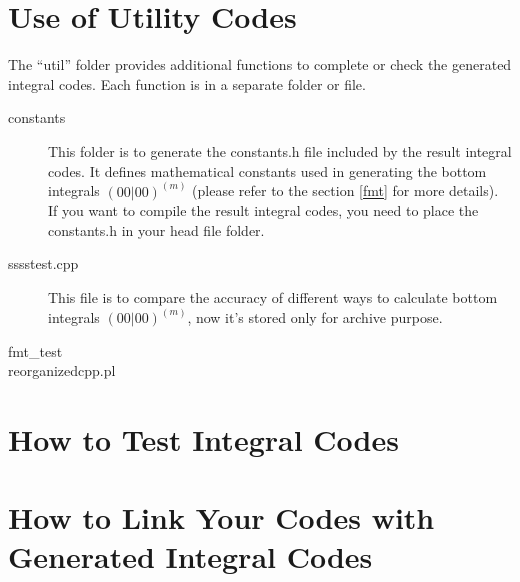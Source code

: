 \section{Use of Utility Codes}
%
%
%
The ``util'' folder provides additional functions to complete or check
the generated integral codes. Each function is in a separate folder or 
file.
\begin{description}
 \item [constants] This folder is to generate the constants.h file included
 by the result integral codes. It defines mathematical constants used in generating
 the bottom integrals $(00|00)^{(m)}$ (please refer to the section \ref{fmt}
 for more details). If you want to compile the result integral codes, you 
 need to place the constants.h in your head file folder.
 \item [sssstest.cpp] This file is to compare the accuracy of different
 ways to calculate bottom integrals $(00|00)^{(m)}$, now it's stored only
 for archive purpose. 
 \item [fmt\_test]
 \item [reorganizedcpp.pl] 
\end{description}




\section{How to Test Integral Codes}

\section{How to Link Your Codes with Generated Integral Codes}
